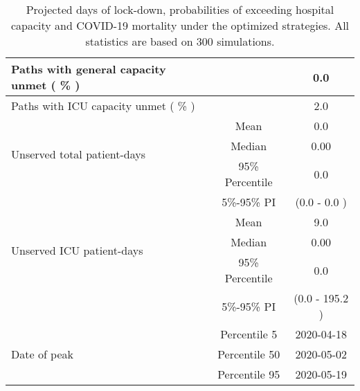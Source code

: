 \documentclass{article}
\begin{document}
\begin{table}[th]
\begin{tabular}{p{4cm}cc}
\multirow{1}{*}{Paths with general capacity unmet ( \% )} &      &         0.0              \\   \midrule 
\multirow{1}{*}{Paths with ICU capacity unmet ( \% )} &      &         2.0              \\   \midrule 
\multirow{3}{\hsize}{Unserved total patient-days} & Mean & 0.0  \\ \cmidrule(l){2-3}
									& Median & 0.00  \\ \cmidrule(l){2-3} 
									& 95\% Percentile     & 0.0    \\ \cmidrule(l){2-3} 
									& 5\%-95\% PI & (0.0 - 0.0 )       \\ \midrule
\multirow{3}{\hsize}{Unserved ICU patient-days} & Mean & 9.0  \\ \cmidrule(l){2-3}
									& Median & 0.00  \\ \cmidrule(l){2-3} 
									& 95\% Percentile     & 0.0    \\ \cmidrule(l){2-3} 
									& 5\%-95\% PI & (0.0 - 195.2 )       \\ \midrule
									
\multirow{3}{\hsize}{Date of peak}   & Percentile 5      & 2020-04-18   \\ \cmidrule(l){2-3} 
                                     & Percentile 50     & 2020-05-02    \\ \cmidrule(l){2-3} 
                                     & Percentile 95     & 2020-05-19     \\  \bottomrule

\end{tabular}
\caption{Projected days of lock-down, probabilities of exceeding hospital capacity and COVID-19 mortality under the optimized strategies. All statistics are based on 300 simulations.}

\label{table:summary_table}
\end{table}
\end{document}
